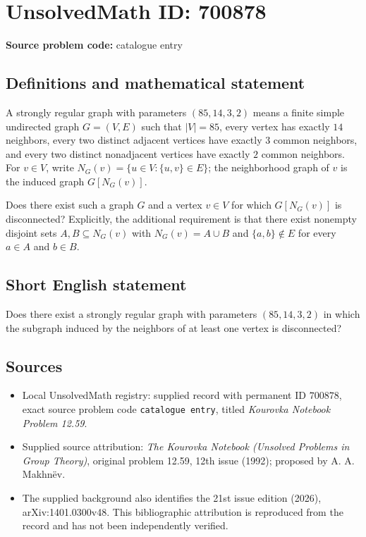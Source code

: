 \documentclass[11pt]{article}
\begin{document}
\section*{UnsolvedMath ID: 700878}
\textbf{Source problem code:} catalogue entry
\subsection{Definitions and mathematical statement}
A strongly regular graph with parameters \((85,14,3,2)\) means a finite simple undirected graph \(G=(V,E)\) such that \(|V|=85\), every vertex has exactly \(14\) neighbors, every two distinct adjacent vertices have exactly \(3\) common neighbors, and every two distinct nonadjacent vertices have exactly \(2\) common neighbors. For \(v\in V\), write \(N_G(v)=\{u\in V:\{u,v\}\in E\}\); the neighborhood graph of \(v\) is the induced graph \(G[N_G(v)]\).

Does there exist such a graph \(G\) and a vertex \(v\in V\) for which \(G[N_G(v)]\) is disconnected? Explicitly, the additional requirement is that there exist nonempty disjoint sets \(A,B\subseteq N_G(v)\) with \(N_G(v)=A\cup B\) and \(\{a,b\}\notin E\) for every \(a\in A\) and \(b\in B\).
\subsection{Short English statement}
Does there exist a strongly regular graph with parameters \((85,14,3,2)\) in which the subgraph induced by the neighbors of at least one vertex is disconnected?
\subsection{Sources}
\begin{itemize}
\item Local UnsolvedMath registry: supplied record with permanent ID \(700878\), exact source problem code \texttt{catalogue entry}, titled \emph{Kourovka Notebook Problem 12.59}.
\item Supplied source attribution: \emph{The Kourovka Notebook (Unsolved Problems in Group Theory)}, original problem 12.59, 12th issue (1992); proposed by A. A. Makhn\"ev.
\item The supplied background also identifies the 21st issue edition (2026), arXiv:1401.0300v48. This bibliographic attribution is reproduced from the record and has not been independently verified.
\end{itemize}
\end{document}
